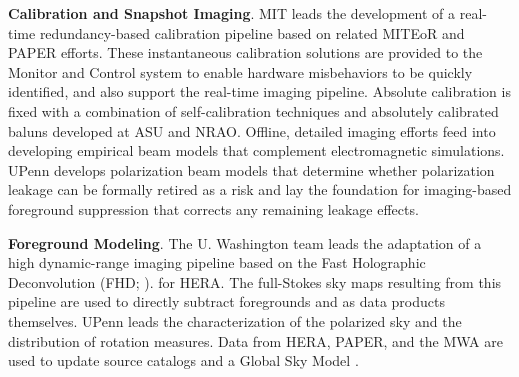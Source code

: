 \documentclass[ars]{/Users/daviddeboer1/Documents/Papers/Copernicus_LaTeX_Package_v_2_7/copernicus}
\begin{document}
{\bf Calibration and Snapshot Imaging}. MIT leads
the development of a real-time redundancy-based calibration pipeline based on related
MITEoR and PAPER efforts.
These instantaneous calibration solutions are provided to
the Monitor and Control system to enable 
hardware misbehaviors to be quickly identified, and also support the
real-time imaging pipeline.  Absolute calibration is fixed with
a combination of self-calibration techniques and absolutely calibrated baluns developed at ASU and NRAO.
Offline, detailed imaging efforts feed into developing
empirical beam models that
complement electromagnetic simulations.  UPenn develops polarization beam models
that determine whether polarization leakage can be formally retired as 
a risk and lay the foundation for imaging-based foreground suppression that
corrects any remaining leakage effects.


{\bf Foreground Modeling}. The U. Washington team leads the adaptation
of a high dynamic-range imaging pipeline
based on the Fast Holographic Deconvolution (FHD; \citealt{sullivan_et_al2012}).
for HERA.  The full-Stokes sky maps resulting from this pipeline
are used to directly subtract foregrounds
and as data products themselves.  UPenn leads
the characterization of the polarized sky and the
distribution of rotation measures.  Data from HERA, PAPER, and the MWA are used
to update source catalogs and a Global
Sky Model \citep{deoliveira2008}. %


\end{document}
